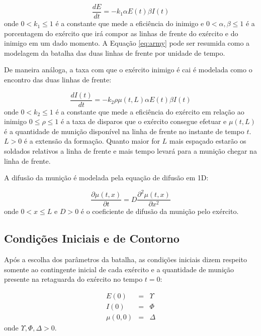 \documentclass{article}
\begin{document}
\begin{equation}
	\frac{dE}{dt} = -k_1 \alpha E(t) \beta I(t)
	\label{eq:army}
\end{equation}
onde $0 < k_1 \leq 1$ é a constante que mede a eficiência do inimigo e $0 < \alpha,\beta \leq 1$ é a porcentagem do exército que irá compor as linhas de frente do exército e do inimigo em um dado momento. A Equação \ref{eq:army} pode ser resumida como a modelagem da batalha das duas linhas de frente por unidade de tempo.

De maneira análoga, a taxa com que o exército inimigo é cai é modelada como o encontro das duas linhas de frente:

\begin{equation}
	\frac{dI(t)}{dt} = -k_2 \rho \mu(t,L) \alpha E(t) \beta I(t)
	\label{eq:enemy}
\end{equation}
onde  $0 < k_2 \leq 1$ é a constante que mede a eficiência do exército em relação ao inimigo $0 \leq \rho \leq 1$ é a taxa de disparos que o exército consegue efetuar e $\mu(t,L)$ é a quantidade de munição disponível na linha de frente no instante de tempo $t$. $L > 0$ é a extensão da formação. Quanto maior for $L$ mais espaçado estarão os soldados relativos a linha de frente e mais tempo levará para a munição chegar na linha de frente.

A difusão da munição é modelada pela equação de difusão em 1D:

\begin{equation}
	\frac{\partial \mu (t,x)}{\partial t} = D \frac{\partial^2 \mu (t,x) }{\partial x^2}
\end{equation}
onde $0 < x \leq L$ e $D > 0$ é o coeficiente de difusão da munição pelo exército.

\subsection{Condições Iniciais e de Contorno}
Após a escolha dos parâmetros da batalha, as condições iniciais dizem respeito somente ao contingente inicial de cada exército e a quantidade de munição presente na retaguarda do exército no tempo $t = 0$:

\begin{eqnarray}
	E(0) &=& \Upsilon \\
	I(0) &=& \Phi \nonumber \\
	\mu(0,0) &=& \Delta \nonumber
	\label{eq:initial-cond}
\end{eqnarray}
onde $\Upsilon, \Phi, \Delta > 0$.
\end{document}
